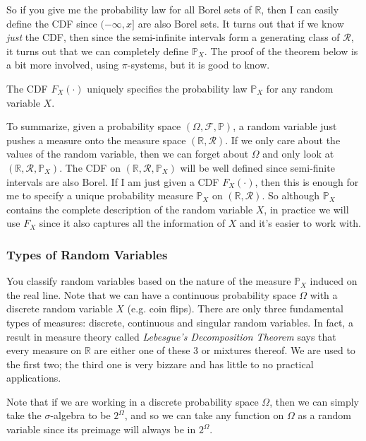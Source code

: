     So if you give me the probability law for all Borel sets of $\mathbb{R}$, then I can easily define the CDF since $(-\infty, x]$ are also Borel sets. It turns out that if we know \textit{just} the CDF, then since the semi-infinite intervals form a generating class of $\mathcal{R}$, it turns out that we can completely define $\mathbb{P}_X$. The proof of the theorem below is a bit more involved, using $\pi$-systems, but it is good to know. 

    \begin{theorem}
      The CDF $F_X (\cdot)$ uniquely specifies the probability law $\mathbb{P}_X$ for any random variable $X$. 
    \end{theorem}

    To summarize, given a probability space $(\Omega, \mathcal{F}, \mathbb{P})$, a random variable just pushes a measure onto the measure space $(\mathbb{R}, \mathcal{R})$. If we only care about the values of the random variable, then we can forget about $\Omega$ and only look at $(\mathbb{R}, \mathcal{R}, \mathbb{P}_X)$. The CDF on $(\mathbb{R}, \mathcal{R}, \mathbb{P}_X)$ will be well defined since semi-finite intervals are also Borel. If I am just given a CDF $F_X (\cdot)$, then this is enough for me to specify a unique probability measure $\mathbb{P}_X$ on $(\mathbb{R}, \mathcal{R})$. So although $\mathbb{P}_X$ contains the complete description of the random variable $X$, in practice we will use $F_X$ since it also captures all the information of $X$ and it's easier to work with. 

  \subsubsection{Types of Random Variables}

    You classify random variables based on the nature of the measure $\mathbb{P}_X$ induced on the real line. Note that we can have a continuous probability space $\Omega$ with a discrete random variable $X$ (e.g. coin flips). There are only three fundamental types of measures: discrete, continuous and singular random variables. In fact, a result in measure theory called \textit{Lebesgue's Decomposition Theorem} says that every measure on $\mathbb{R}$ are either one of these 3 or mixtures thereof. We are used to the first two; the third one is very bizzare and has little to no practical applications. 

    Note that if we are working in a discrete probability space $\Omega$, then we can simply take the $\sigma$-algebra to be $2^\Omega$, and so we can take any function on $\Omega$ as a random variable since its preimage will always be in $2^\Omega$. 

